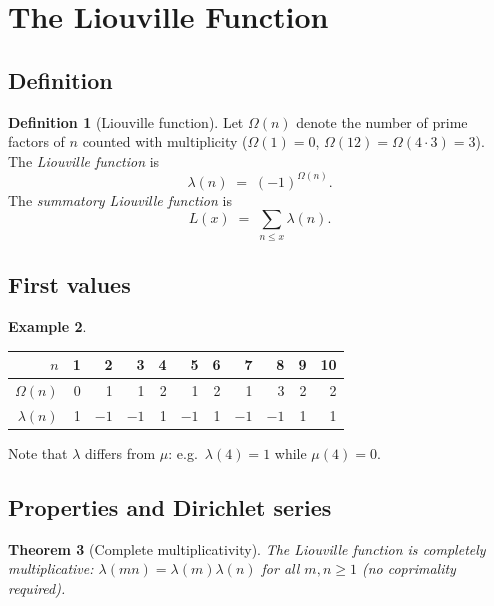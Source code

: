 \documentclass[12pt,a4paper]{amsart}
\newtheorem{theorem}{Theorem}[section]
\theoremstyle{definition}
\newtheorem{definition}[theorem]{Definition}
\newtheorem{example}[theorem]{Example}
\begin{document}
\section{The Liouville Function}
\label{sec:liouville}

\subsection{Definition}

\begin{definition}[Liouville function]
\label{def:liouville}
Let $\Omega(n)$ denote the number of prime factors of $n$ counted with
multiplicity ($\Omega(1)=0$, $\Omega(12)=\Omega(4\cdot 3)=3$).  The
\emph{Liouville function} is
\[
  \lambda(n) \;=\; (-1)^{\Omega(n)}.
\]
The \emph{summatory Liouville function} is
\[
  L(x) \;=\; \sum_{n \le x} \lambda(n).
\]
\end{definition}

\subsection{First values}

\begin{example}
\label{ex:liouville-values}
\begin{center}
\begin{tabular}{r|rrrrrrrrrr}
$n$       & 1 & 2 & 3 & 4 & 5 & 6 & 7 & 8 & 9 & 10 \\
\hline
$\Omega(n)$ & 0 & 1 & 1 & 2 & 1 & 2 & 1 & 3 & 2 & 2 \\
$\lambda(n)$& 1 &$-1$&$-1$& 1 &$-1$& 1 &$-1$&$-1$& 1 & 1
\end{tabular}
\end{center}
Note that $\lambda$ differs from $\mu$: e.g.\ $\lambda(4)=1$ while $\mu(4)=0$.
\end{example}

\subsection{Properties and Dirichlet series}

\begin{theorem}[Complete multiplicativity]
\label{thm:liouville-mult}
The Liouville function is \emph{completely multiplicative}: $\lambda(mn) =
\lambda(m)\lambda(n)$ for \emph{all} $m,n \ge 1$ (no coprimality required).
\end{theorem}
\end{document}
